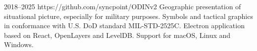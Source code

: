 \cventry
{2018--2025}
{https://github.com/syncpoint/ODINv2}
{}
{}
{}
{
  Geographic presentation of situational picture, especially for military purposes.
  Symbols and tactical graphics in conformance with U.S. DoD standard MIL-STD-2525C.
  Electron application based on React, OpenLayers and LevelDB.
  Support for macOS, Linux and Windows.
}
